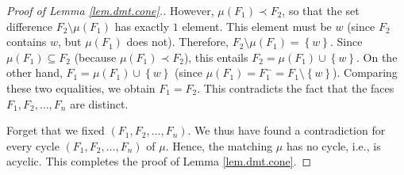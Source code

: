 \documentclass[12pt]{amsart}
\theoremstyle{definition}
\begin{document}
\begin{proof}[Proof of Lemma \ref{lem.dmt.cone}.]
However, $\mu\left(  F_{1}\right)  \prec F_{2}$, so that the set difference
$F_{2}\setminus\mu\left(  F_{1}\right)  $ has exactly $1$ element. This
element must be $w$ (since $F_{2}$ contains $w$, but $\mu\left(  F_{1}\right)
$ does not). Therefore, $F_{2}\setminus\mu\left(  F_{1}\right)  =\left\{
w\right\}  $. Since $\mu\left(  F_{1}\right)  \subseteq F_{2}$ (because
$\mu\left(  F_{1}\right)  \prec F_{2}$), this entails $F_{2}=\mu\left(
F_{1}\right)  \cup\left\{  w\right\}  $. On the other hand, $F_{1}=\mu\left(
F_{1}\right)  \cup\left\{  w\right\}  $ (since $\mu\left(  F_{1}\right)
=F_{1}^-=F_{1}\setminus\left\{  w\right\}  $). Comparing these two
equalities, we obtain $F_{1}=F_{2}$. This contradicts the fact that the faces
$F_{1},F_{2},\ldots,F_{n}$ are distinct.

Forget that we fixed $\left(  F_{1},F_{2},\ldots,F_{n}\right)  $. We thus have
found a contradiction for every cycle $\left(  F_{1},F_{2},\ldots
,F_{n}\right)  $ of $\mu$. Hence, the matching $\mu$ has no cycle, i.e., is
acyclic. This completes the proof of Lemma \ref{lem.dmt.cone}.
\end{proof}
\end{document}
